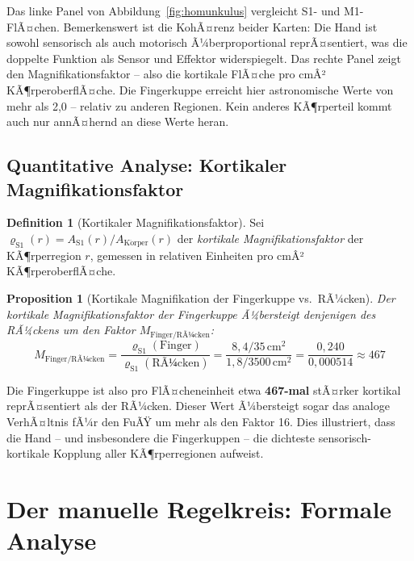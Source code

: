 ﻿\documentclass[12pt,a4paper]{report}
\theoremstyle{plain}
\newtheorem{proposition}[theorem]{Proposition}
\theoremstyle{definition}
\newtheorem{definition}[theorem]{Definition}
\theoremstyle{remark}
\begin{document}
Das linke Panel von Abbildung~\ref{fig:homunkulus} vergleicht S1- und
M1-FlÃ¤chen. Bemerkenswert ist die KohÃ¤renz beider Karten: Die Hand ist
sowohl sensorisch als auch motorisch Ã¼berproportional reprÃ¤sentiert,
was die doppelte Funktion als Sensor und Effektor widerspiegelt.
Das rechte Panel zeigt den Magnifikationsfaktor -- also die kortikale
FlÃ¤che pro cmÂ² KÃ¶rperoberflÃ¤che. Die Fingerkuppe erreicht hier
astronomische Werte von mehr als 2,0 -- relativ zu anderen Regionen.
Kein anderes KÃ¶rperteil kommt auch nur annÃ¤hernd an diese Werte heran.

\section{Quantitative Analyse: Kortikaler Magnifikationsfaktor}

\begin{definition}[Kortikaler Magnifikationsfaktor]
\label{def:magnifikation}
Sei $\varrho_{\mathrm{S1}}(r) = A_{\mathrm{S1}}(r) / A_{\mathrm{K\ddot{o}rper}}(r)$
der \emph{kortikale Magnifikationsfaktor} der KÃ¶rperregion $r$, gemessen
in relativen Einheiten pro cmÂ² KÃ¶rperoberflÃ¤che.
\end{definition}

\begin{proposition}[Kortikale Magnifikation der Fingerkuppe vs.\ RÃ¼cken]
Der kortikale Magnifikationsfaktor der Fingerkuppe Ã¼bersteigt denjenigen
des RÃ¼ckens um den Faktor $M_{\text{Finger/RÃ¼cken}}$:
\[
  M_{\text{Finger/RÃ¼cken}}
  = \frac{\varrho_{\mathrm{S1}}(\text{Finger})}{\varrho_{\mathrm{S1}}(\text{RÃ¼cken})}
  = \frac{8{,}4 / 35\,\mathrm{cm}^2}{1{,}8 / 3500\,\mathrm{cm}^2}
  = \frac{0{,}240}{0{,}000514} \approx 467
\]
\end{proposition}

Die Fingerkuppe ist also pro FlÃ¤cheneinheit etwa \textbf{467-mal} stÃ¤rker
kortikal reprÃ¤sentiert als der RÃ¼cken. Dieser Wert Ã¼bersteigt sogar das
analoge VerhÃ¤ltnis fÃ¼r den FuÃŸ \cite{epp2026feed} um mehr als den Faktor 16.
Dies illustriert, dass die Hand -- und insbesondere die Fingerkuppen --
die dichteste sensorisch-kortikale Kopplung aller KÃ¶rperregionen aufweist.

\chapter{Der manuelle Regelkreis: Formale Analyse}
\label{chap:regelkreis}
\end{document}
